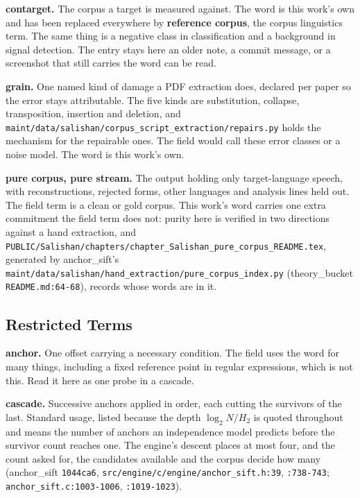 \noindent\textbf{contarget.} The corpus a target is measured against. The word is this work's own and has been replaced everywhere by \textbf{reference corpus}, the corpus linguistics term. The same thing is a negative class in classification and a background in signal detection. The entry stays here an older note, a commit message, or a screenshot that still carries the word can be read.

\noindent\textbf{grain.} One named kind of damage a PDF extraction does, declared per paper so the error stays attributable. The five kinds are substitution, collapse, transposition, insertion and deletion, and \texttt{maint/\allowbreak{}data/\allowbreak{}salishan/\allowbreak{}corpus\_\allowbreak{}script\_\allowbreak{}extraction/\allowbreak{}repairs.\allowbreak{}py} holds the mechanism for the repairable ones. The field would call these error classes or a noise model. The word is this work's own.

\noindent\textbf{pure corpus, pure stream.} The output holding only target-language speech, with reconstructions, rejected forms, other languages and analysis lines held out. The field term is a clean or gold corpus. This work's word carries one extra commitment the field term does not: purity here is verified in two directions against a hand extraction, and \texttt{PUBLIC/\allowbreak{}Salishan/\allowbreak{}chapters/\allowbreak{}chapter\_\allowbreak{}Salishan\_\allowbreak{}pure\_\allowbreak{}corpus\_\allowbreak{}README.\allowbreak{}tex}, generated by anchor\_sift's \texttt{maint/\allowbreak{}data/\allowbreak{}salishan/\allowbreak{}hand\_\allowbreak{}extraction/\allowbreak{}pure\_\allowbreak{}corpus\_\allowbreak{}index.\allowbreak{}py} (theory\_bucket \texttt{README.md:64-\allowbreak{}68}), records whose words are in it.

\subsection{Restricted Terms}

\noindent\textbf{anchor.} One offset carrying a necessary condition. The field uses the word for many things, including a fixed reference point in regular expressions, which is not this. Read it here as one probe in a cascade.

\noindent\textbf{cascade.} Successive anchors applied in order, each cutting the survivors of the last. Standard usage, listed because the depth \(\log_2 N / H_2\) is quoted throughout and means the number of anchors an independence model predicts before the survivor count reaches one. The engine's descent places at most four, and the count asked for, the candidates available and the corpus decide how many (anchor\_sift \texttt{1044ca6}, \texttt{src/\allowbreak{}engine/\allowbreak{}c/\allowbreak{}engine/\allowbreak{}anchor\_sift.h:39}, \texttt{:738-743}; \texttt{anchor\_sift.c:1003-1006}, \texttt{:1019-1023}).

